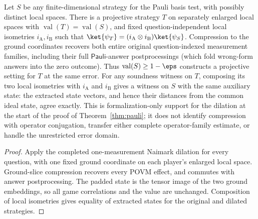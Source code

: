 \begin{theorem}
  \label{thm:pauli-naimark-reduction-support}
  \leanok
  Let $S$ be any finite-dimensional strategy for the Pauli basis test,
  with possibly distinct local spaces. There is a projective strategy $T$
  on separately enlarged local spaces with $\operatorname{val}(T)
  =\operatorname{val}(S)$, and fixed question-independent local isometries
  $i_{\mathrm A},i_{\mathrm B}$ such that
  $\ket{\psi_T}=(i_{\mathrm A}\otimes i_{\mathrm B})\ket{\psi_S}$.
  Compression to the ground coordinates recovers both entire original
  question-indexed measurement families, including their full
  $\mathsf{Pauli}$-answer postprocessings (which fold wrong-form answers into
  the zero outcome). Thus $\operatorname{val}(S)\geq1-\eps$ constructs a
  projective setting for $T$ at the same error. For any soundness witness on
  $T$, composing its two local isometries with $i_{\mathrm A}$ and
  $i_{\mathrm B}$ gives a witness on $S$ with the same auxiliary state:
  the extracted state vectors, and hence their distances from the common
  ideal state, agree exactly. This is formalization-only support for the
  dilation at the start of the proof of Theorem~\ref{thm:pauli}; it does not
  identify compression with operator conjugation, transfer either complete
  operator-family estimate, or handle the unrestricted error domain.
\end{theorem}
\begin{proof}
  \leanok
  Apply the completed one-measurement Naimark dilation for every question,
  with one fixed ground coordinate on each player's enlarged local space.
  Ground-slice compression recovers every POVM effect, and commutes with
  answer postprocessing. The padded state is the tensor image of the two
  ground embeddings, so all game correlations and the value are unchanged.
  Composition of local isometries gives equality of extracted states for
  the original and dilated strategies.
\end{proof}

